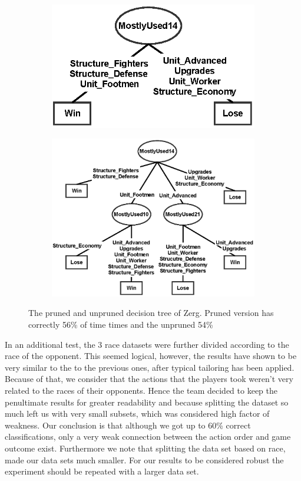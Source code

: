 \documentclass[a4paper,11pt]{article}
\begin{document}
\begin{figure}[H]
\centering
\begin{subfigure}{.5\textwidth}
  \centering
  \includegraphics[width=.95\linewidth]{tree_zerg_pruned}
\end{subfigure}%
\begin{subfigure}{.5\textwidth}
  \centering
  \includegraphics[width=.95\linewidth]{tree_zerg_unpruned}
\end{subfigure}
\caption{The pruned and unpruned decision tree of Zerg. Pruned version has correctly 56\% of time times and the unpruned 54\%}
\label{fig:win:zerg}
\end{figure}

In an additional test, the 3 race datasets were further divided according to the race of the opponent. This seemed logical, however, the results have shown to be very similar to the to the previous ones, after typical tailoring has been applied. Because of that, we consider that the actions that the players took weren’t very related to the races of their opponents. Hence the team decided to keep the penultimate results for greater readability and because splitting the dataset so much left us with very small subsets, which was considered high factor of weakness.
Our conclusion is that although we got up to 60\% correct classifications, only a very weak connection between the action order and game outcome exist. Furthermore we note that splitting the data set based on race, made our data sets much smaller. For our results to be considered robust the experiment should be repeated with a larger data set.
\end{document}
